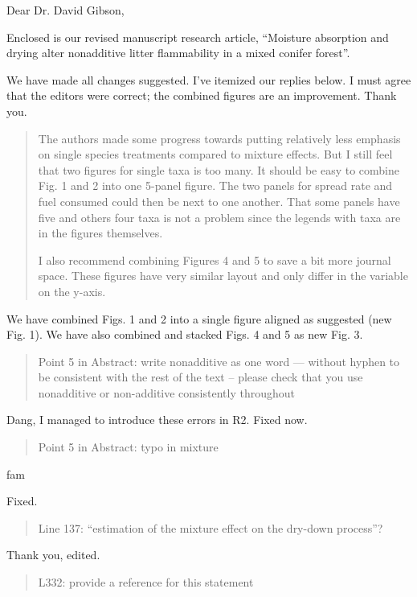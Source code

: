 \documentclass[letterpaper, 12pt]{letter}
\begin{document}
\begin{letter}{}

\opening{Dear Dr. David Gibson,}

Enclosed is our revised manuscript research article, ``Moisture absorption and
drying alter nonadditive litter flammability in a mixed conifer forest''.

We have made all changes suggested. I've itemized our replies below. I must agree that the editors were correct; the combined figures are an improvement. Thank you.

\begin{quote}
The authors made some progress towards putting relatively less emphasis on
single species treatments compared to mixture effects. But I still feel that
two figures for single taxa is too many. It should be easy to combine Fig. 1
and 2 into one 5-panel figure. The two panels for spread rate and fuel consumed
could then be next to one another. That some panels have five and others four
taxa is not a problem since the legends with taxa are in the figures
themselves.

I also recommend combining Figures 4 and 5 to save a bit more journal space.
These figures have very similar layout and only differ in the variable on the
y-axis.
\end{quote}

We have combined Figs. 1 and 2 into a single figure aligned as suggested (new Fig. 1). We have also combined and stacked Figs. 4 and 5 as new Fig. 3.

\begin{quote}
  Point 5 in Abstract: write nonadditive as one word --- without hyphen to be
  consistent with the rest of the text – please check that you use nonadditive or
  non-additive consistently throughout
\end{quote}

Dang, I managed to introduce these errors in R2. Fixed now.

\begin{quote}
Point 5 in Abstract: typo in mixture
\end{quote}fam


Fixed.

\begin{quote}
  Line 137: ``estimation of the mixture effect on the dry-down process''?
\end{quote}

Thank you, edited.

\begin{quote}
  L332: provide a reference for this statement
\end{quote}


\end{letter}
\end{document}
